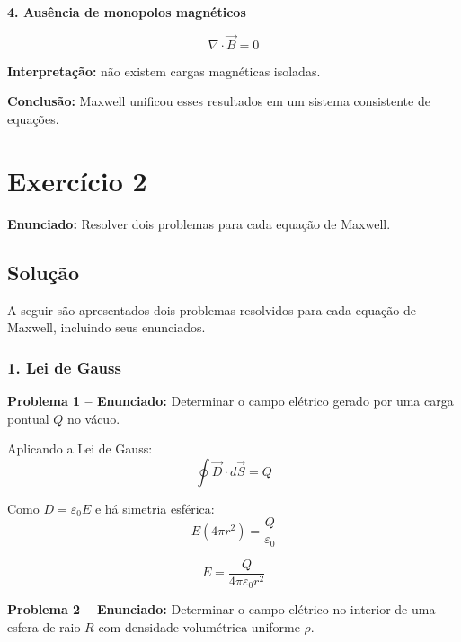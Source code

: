 \documentclass[12pt,a4paper]{article}
\begin{document}
\vspace{0.3cm}

\textbf{4. Ausência de monopolos magnéticos}

\begin{equation}
\nabla \cdot \vec{B} = 0
\end{equation}

\textbf{Interpretação:} não existem cargas magnéticas isoladas.

\vspace{0.3cm}

\textbf{Conclusão:} Maxwell unificou esses resultados em um sistema consistente de equações.

\newpage

\section*{Exercício 2}

\textbf{Enunciado:} Resolver dois problemas para cada equação de Maxwell.

\subsection*{Solução}

A seguir são apresentados dois problemas resolvidos para cada equação de Maxwell, incluindo seus enunciados.

\subsubsection*{1. Lei de Gauss}

\textbf{Problema 1 -- Enunciado:} Determinar o campo elétrico gerado por uma carga pontual $Q$ no vácuo.

Aplicando a Lei de Gauss:
\begin{equation}
    \oint \vec{D} \cdot d\vec{S} = Q
\end{equation}

Como $D = \varepsilon_0 E$ e há simetria esférica:
\begin{equation}
    E(4\pi r^2) = \frac{Q}{\varepsilon_0}
\end{equation}

\begin{equation}
    \boxed{E = \frac{Q}{4\pi \varepsilon_0 r^2}}
\end{equation}

\textbf{Problema 2 -- Enunciado:} Determinar o campo elétrico no interior de uma esfera de raio $R$ com densidade volumétrica uniforme $\rho$.
\end{document}
